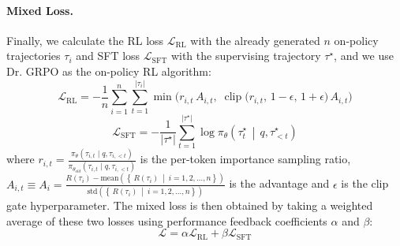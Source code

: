 \documentclass{article} %
\newcommand{\0}{\mathbb{0}}
\newcommand{\1}{\mathbb{1}}
\begin{document}
\paragraph{Mixed Loss.} Finally, we calculate the RL loss $\mathcal{L}_{\mathrm{RL}}$ with the already generated $n$ on-policy trajectories $\tau_i$ and SFT loss $\mathcal{L}_{\mathrm{SFT}}$ with the supervising trajectory $\tau^\star$, and we use Dr. GRPO as the on-policy RL algorithm:
\begin{equation}
\label{eq: rl loss}
\mathcal{L}_{\mathrm{RL}}
=
-\frac{1}{n}\sum_{i=1}^{n}\sum_{t=1}^{|\tau_i|}
\min\!\Big(
r_{i,t}\,A_{i,t},\;
\operatorname{clip}\!\big(r_{i,t},\,1-\epsilon,\,1+\epsilon\big)\,A_{i,t}
\Big)
\end{equation}
\begin{equation}
\label{eq: sft loss}
\mathcal{L}_{\mathrm{SFT}}=
-\frac{1}{\lvert \tau^\star \rvert}
\sum_{t=1}^{\lvert \tau^\star \rvert}
\log \pi_\theta\!\left(\tau^\star_t \,\middle|\, q, \tau^\star_{<t}\right)
\end{equation}
where $r_{i,t}=\frac{\pi_{\theta}\left(\tau_{i,t}\mid q, \tau_{i,<t}\right)}{\pi_{\theta_{old}}\left(\tau_{i,t}\mid q, \tau_{i,<t}\right)}$ is the per-token importance sampling ratio, $A_{i,t}\equiv A_i =\frac{  R(\tau_i)-\mathrm{mean}\left(\left\{\, R(\tau_i)\ \middle|\ i=1,2,\ldots,n \right\}\right)}{\mathrm{std}\left(\left\{\, R(\tau_i)\ \middle|\  i=1,2,\ldots,n \right\}\right)}$ is the advantage  and $\epsilon$ is the clip gate hyperparameter.
The mixed loss is then obtained by taking a weighted average of these two losses using performance feedback coefficients $\alpha$ and $\beta$: 
\begin{equation}
\mathcal{L} = \alpha \mathcal{L}_{\mathrm{RL}} + \beta \mathcal{L}_{\mathrm{SFT}}
\end{equation}
\end{document}

